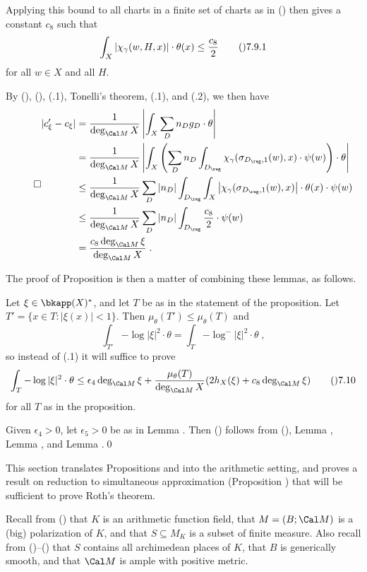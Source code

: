 Applying this bound to all charts in a finite set of charts as in ()
then gives a constant $c_8$ such that
$$\int_X |\chi_\gamma(w,H,x)|\cdot\theta(x) \le \frac{c_8}{2}\tag\07.9.1$$
for all $w\in X$ and all $H$.

By (), (), (.1), Tonelli's theorem, (.1), and (.2),
we then have
$$\qed\split |c_\xi'-c_\xi|
  &= \frac1{\deg_{\Cal M} X} \left|\int_X \sum_D n_D g_D\cdot\theta\right| \\
  &= \frac1{\deg_{\Cal M} X}
    \left|\int_X \left(\sum_D n_D \int_{D_\reg}
      \chi_\gamma(\sigma_{D_\reg,1}(w),x)\cdot\psi(w)\right)
      \cdot\theta\right| \\
  &\le \frac1{\deg_{\Cal M} X} \sum_D |n_D| \int_{D_\reg} \int_X
    \left|\chi_\gamma(\sigma_{D_\reg,1}(w),x)\right|\cdot\theta(x)\cdot\psi(w)
    \\
  &\le \frac1{\deg_{\Cal M} X} \sum_D |n_D| \int_{D_\reg}
    \frac{c_8}{2}\cdot\psi(w) \\
  &= \frac{c_8\deg_{\Cal M} \xi}{\deg_{\Cal M} X}\;.\endsplit$$
\enddemo

The proof of Proposition  is then a matter of combining these lemmas,
as follows.

  Let $\xi\in\bkapp(X)^{*}$, and let $T$ be
as in the statement of the proposition.  Let $T'=\{x\in T:|\xi(x)|<1\}$.
Then $\mu_\theta(T')\le\mu_\theta(T)$ and
$$\int_{T'} {-\log |\xi|^2} \cdot\theta
  = \int_T {-\log^{-}|\xi|^2} \cdot\theta\;,$$
so instead of (.1) it will suffice to prove
$$\int_T {-\log |\xi|^2} \cdot\theta
  \le \epsilon_4\deg_{\Cal M}\xi
    + \frac{\mu_\theta(T)}{\deg_{\Cal M} X} (2h_X(\xi) + c_8\deg_{\Cal M} \xi)
  \tag\07.10$$
for all $T$ as in the proposition.

Given $\epsilon_4>0$, let $\epsilon_5>0$ be as in Lemma .
Then () follows from (), Lemma , Lemma , and
Lemma .\qed
\enddemo


This section translates Propositions  and  into the arithmetic
setting, and proves a result on reduction to simultaneous approximation
(Proposition ) that will be sufficient to prove Roth's theorem.

Recall from () that $K$ is an arithmetic function field,
that $M=(B;\Cal M)$ is a (big) polarization of $K$, and that $S\subseteq M_K$
is a subset of finite measure.  Also recall from ()--() that
$S$ contains all archimedean places of $K$, that $B$ is generically smooth,
and that $\Cal M$ is ample with positive metric.

